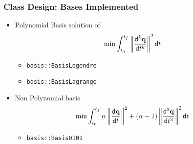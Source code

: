 \begin{frame}[fragile]
	\frametitle{Class Design: Bases Implemented}
	\begin{itemize}
		\item Polynomial Basis solution of
		      \begin{eqnarray}
			      \min \int_{t_0}^{t_f} \left\|\frac{\mathsf{d}^{k} \mathbf{q}}{\mathsf{d} t^{k}}\right\|^2 \mathsf{d} t
		      \end{eqnarray}
		      \begin{itemize}
			      \item  \Verb|basis::BasisLegendre|
			      \item  \Verb|basis::BasisLagrange|
		      \end{itemize}
		\item Non Polynomial basis
		      \begin{eqnarray}
			      \min \int_{t_0}^{t_f} \alpha \left\|\frac{\mathsf{d}^{} \mathbf{q}}{\mathsf{d} t^{}}\right\|^2  + (\alpha - 1 )\left\|\frac{\mathsf{d}^{3} \mathbf{q}}{\mathsf{d} t^{3}}\right\|^2 \mathsf{d} t
		      \end{eqnarray}
		      \begin{itemize}
			      \item  \Verb|basis::Basis0101|
		      \end{itemize}
	\end{itemize}
\end{frame}

